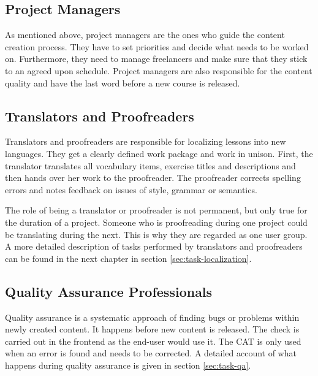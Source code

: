 \subsection{Project Managers}
As mentioned above, project managers are the ones who guide the content creation process. They have to set priorities and decide what needs to be worked on. Furthermore, they need to manage freelancers and make sure that they stick to an agreed upon schedule. Project managers are also responsible for the content quality and have the last word before a new course is released.

\subsection{Translators and Proofreaders}
Translators and proofreaders are responsible for localizing lessons into new languages. They get a clearly defined work package and work in unison. First, the translator translates all vocabulary items, exercise titles and descriptions and then hands over her work to the proofreader. The proofreader corrects spelling errors and notes feedback on issues of style, grammar or semantics.

The role of being a translator or proofreader is not permanent, but only true for the duration of a project. Someone who is proofreading during one project could be translating during the next. This is why they are regarded as one user group. A more detailed description of tasks performed by translators and proofreaders can be found in the next chapter in section \ref{sec:task-localization}.


\subsection{Quality Assurance Professionals}
Quality assurance is a systematic approach of finding bugs or problems within newly created content. It happens before new content is released. The check is carried out in the frontend as the end-user would use it. The CAT is only used when an error is found and needs to be corrected. A detailed account of what happens during quality assurance is given in section \ref{sec:task-qa}.

